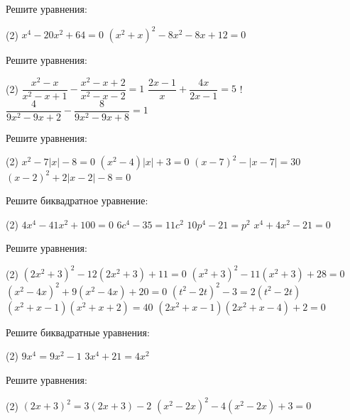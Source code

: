 %
%

\begin{class}[number=1]
	\begin{listofex}
		\item Решите уравнения:
		\begin{tasks}(2)
			\task \( x^4-20x^2+64=0 \)
			\task \( (x^2+x)^2-8x^2-8x+12=0 \)
		\end{tasks}
		\item Решите уравнения:
		\begin{tasks}(2)
			\task \( \dfrac{x^2-x}{x^2-x+1}-\dfrac{x^2-x+2}{x^2-x-2}=1 \)
			\task \( \dfrac{2x-1}{x}+\dfrac{4x}{2x-1}=5 \)
			\task! \( \dfrac{4}{9x^2-9x+2}-\dfrac{8}{9x^2-9x+8}=1 \)
		\end{tasks}
		\item Решите уравнения:
		\begin{tasks}(2)
			\task \( x^2-7|x|-8=0 \)
			\task \( (x^2-4)|x|+3=0 \)
			\task \( (x-7)^2-|x-7|=30 \)
			\task \( (x-2)^2+2|x-2|-8=0 \)
		\end{tasks}
	\end{listofex}
\end{class}

\begin{class}[number=2]
	\begin{listofex}
		\item Решите биквадратное уравнение:
		\begin{tasks}(2)
			\task \( 4x^4-41x^2+100=0 \)
			\task \( 6c^4-35=11c^2 \)
			\task \( 10p^4-21=p^2 \)
			\task \( x^4+4x^2-21=0 \)
		\end{tasks}
		\item Решите уравнения:
		\begin{tasks}(2)
			\task \( (2x^2+3)^2-12(2x^2+3)+11=0 \)
			\task \( (x^2+3)^2-11(x^2+3)+28=0 \)
			\task \( (x^2-4x)^2+9(x^2-4x)+20=0 \)
			\task \( (t^2-2t)^2-3=2(t^2-2t) \)
			\task \( (x^2+x-1)(x^2+x+2)=40 \)
			\task \( (2x^2+x-1)(2x^2+x-4)+2=0 \)
		\end{tasks}
	\end{listofex}
\end{class}

\begin{homework}[number=1]
	\begin{listofex}
		\item Решите биквадратные уравнения:
		\begin{tasks}(2)
			\task \( 9x^4=9x^2-1 \)
			\task \( 3x^4+21=4x^2 \)
		\end{tasks}
		\item Решите уравнения:
		\begin{tasks}(2)
			\task \( (2x+3)^2=3(2x+3)-2 \)
			\task \( (x^2-2x)^2-4(x^2-2x)+3=0 \)
		\end{tasks}
	\end{listofex}
\end{homework}

